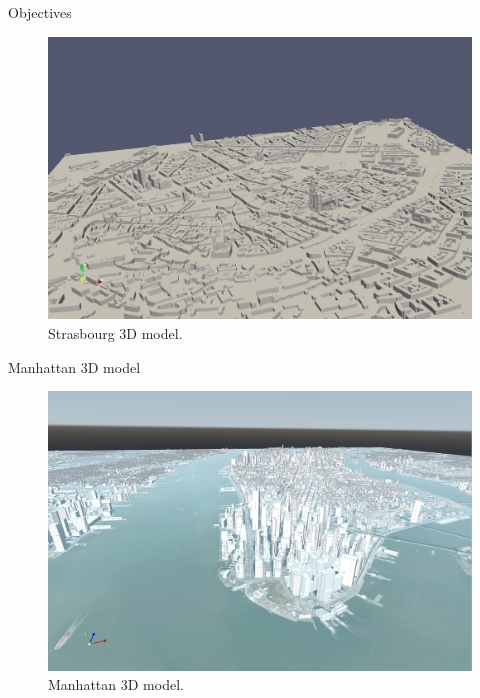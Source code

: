 \documentclass[10pt]{beamer}
\begin{document}
\begin{frame}{Objectives}
  \begin{figure}[H]
    \centering
    \includegraphics[width=1\textwidth]{images/stras_mesh.png}
    \caption{Strasbourg 3D model.}
  \end{figure}
\end{frame}

\begin{frame}{Manhattan 3D model}
  \begin{figure}[H]
    \centering
    \includegraphics[width=1\textwidth]{images/manhattan_mesh.png}
    \caption{Manhattan 3D model.}
  \end{figure}
\end{frame}
\end{document}
